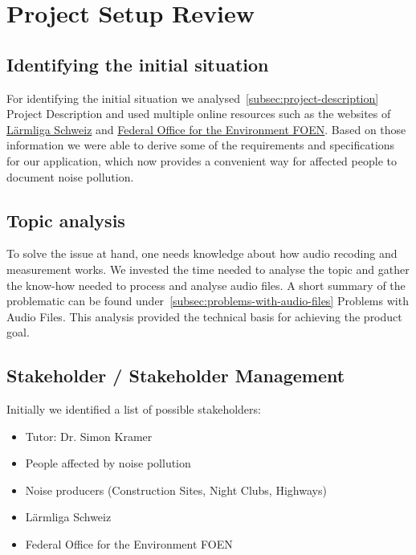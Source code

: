 \section{Project Setup Review}\label{sec:project-setup-review}

\subsection{Identifying the initial situation}\label{subsec:identifying-the-initial-situation}
For identifying the initial situation we analysed~\ref{subsec:project-description} Project Description and used multiple online resources
such as the websites of \href{https://laermliga.ch/}{Lärmliga Schweiz} and \href{https://www.bafu.admin.ch/bafu/en/home/topics/noise/in-brief.html}{Federal Office for the Environment FOEN}.
Based on those information we were able to derive some of the requirements and specifications for our application,
which now provides a convenient way for affected people to document noise pollution.

\subsection{Topic analysis}\label{subsec:topic-analysis}
To solve the issue at hand, one needs knowledge about how audio recoding and measurement works.
We invested the time needed to analyse the topic and gather the know-how needed to process and analyse audio files.
A short summary of the problematic can be found under~\ref{subsec:problems-with-audio-files} Problems with Audio Files.
This analysis provided the technical basis for achieving the product goal.

\subsection{Stakeholder / Stakeholder Management}\label{subsec:stakeholder-management}
Initially we identified a list of possible stakeholders:

\begin{itemize}
    \item Tutor: Dr. Simon Kramer
    \item People affected by noise pollution
    \item Noise producers (Construction Sites, Night Clubs, Highways)
    \item Lärmliga Schweiz
    \item Federal Office for the Environment FOEN
\end{itemize}

